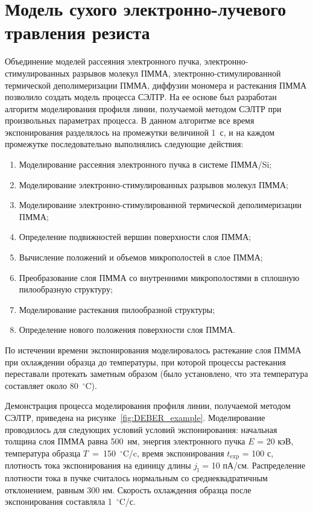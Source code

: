 \section{Модель сухого электронно-лучевого травления резиста} \label{sec:DEBER_model}

Объединение моделей рассеяния электронного пучка, электронно-стимулированных разрывов молекул ПММА, электронно-стимулированной термической деполимеризации ПММА, диффузии мономера и растекания ПММА позволило создать модель процесса СЭЛТР. На ее основе был разработан алгоритм моделирования профиля линии, получаемой методом СЭЛТР при произвольных параметрах процесса. В данном алгоритме все время экспонирования разделялось на промежутки величиной 1~с, и на каждом промежутке последовательно выполнялись следующие действия:

\begin{enumerate}
	\item Моделирование рассеяния электронного пучка в системе ПММА/Si;
	\item Моделирование электронно-стимулированных разрывов молекул \linebreak ПММА;
	\item Моделирование электронно-стимулированной термической деполимеризации ПММА;
	\item Определение подвижностей вершин поверхности слоя ПММА;
	\item Вычисление положений и объемов микрополостей в слое ПММА;
	\item Преобразование слоя ПММА со внутренними микрополостями в сплошную пилообразную структуру;
	\item Моделирование растекания пилообразной структуры;
	\item Определение нового положения поверхности слоя ПММА.
\end{enumerate}
По истечении времени экспонирования моделировалось растекание слоя ПММА при охлаждении образца до температуры, при которой процессы растекания переставали протекать заметным образом (было установлено, что эта температура составляет около 80~$^{\circ}$C).

Демонстрация процесса моделирования профиля линии, получаемой методом СЭЛТР, приведена на рисунке~\ref{fig:DEBER_example}.
Моделирование проводилось для следующих условий условий экспонирования: начальная толщина слоя ПММА равна 500~нм, энергия электронного пучка $E$ = 20 кэВ, температура образца $T$~=~150~$^{\circ}$C/c, время экспонирования $t_\mathrm{exp}$ = 100 с, плотность тока экспонирования на единицу длины $j_\mathrm{l}$ = 10 пА/см.
Распределение плотности тока в пучке считалось нормальным со среднеквадратичным отклонением, равным 300 нм.
Скорость охлаждения образца после экспонирования составляла 1~$^{\circ}$C/с.

